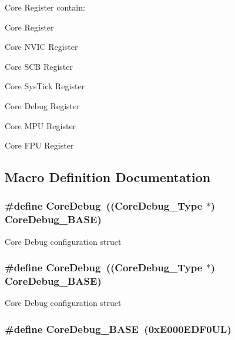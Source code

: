Core Register contain\-:
\begin{DoxyItemize}
\item Core Register
\item Core N\-V\-I\-C Register
\item Core S\-C\-B Register
\item Core Sys\-Tick Register
\item Core Debug Register
\item Core M\-P\-U Register
\item Core F\-P\-U Register 
\end{DoxyItemize}

\subsection{Macro Definition Documentation}
\hypertarget{group___c_m_s_i_s__core__register_gab6e30a2b802d9021619dbb0be7f5d63d}{
\subsubsection[{Core\-Debug}]{\setlength{\rightskip}{0pt plus 5cm}\#define Core\-Debug~(({\bf Core\-Debug\-\_\-\-Type} $\ast$)     {\bf Core\-Debug\-\_\-\-B\-A\-S\-E})}}\label{group___c_m_s_i_s__core__register_gab6e30a2b802d9021619dbb0be7f5d63d}
Core Debug configuration struct \hypertarget{group___c_m_s_i_s__core__register_gab6e30a2b802d9021619dbb0be7f5d63d}{
\subsubsection[{Core\-Debug}]{\setlength{\rightskip}{0pt plus 5cm}\#define Core\-Debug~(({\bf Core\-Debug\-\_\-\-Type} $\ast$)     {\bf Core\-Debug\-\_\-\-B\-A\-S\-E})}}\label{group___c_m_s_i_s__core__register_gab6e30a2b802d9021619dbb0be7f5d63d}
Core Debug configuration struct \hypertarget{group___c_m_s_i_s__core__register_ga680604dbcda9e9b31a1639fcffe5230b}{
\subsubsection[{Core\-Debug\-\_\-\-B\-A\-S\-E}]{\setlength{\rightskip}{0pt plus 5cm}\#define Core\-Debug\-\_\-\-B\-A\-S\-E~(0x\-E000\-E\-D\-F0\-U\-L)}}\label{group___c_m_s_i_s__core__register_ga680604dbcda9e9b31a1639fcffe5230b}
